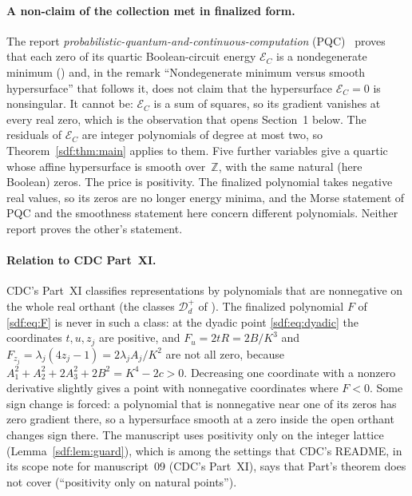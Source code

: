 \documentclass[11pt,a4paper]{article}
\theoremstyle{definition}
\theoremstyle{remark}
\newcommand{\Z}{\mathbb Z}
\newcommand{\Dplus}{\mathcal D^{+}}
\begin{document}
\paragraph{A non-claim of the collection met in finalized form.} The report
\emph{probabilistic-quantum-and-continuous-computation} (PQC)~\cite{pqcreport}
proves that each zero of its quartic Boolean-circuit energy $\mathcal E_C$
is a nondegenerate minimum () and, in the remark
``Nondegenerate minimum versus smooth hypersurface'' that follows it, does
not claim that the hypersurface $\mathcal E_C=0$ is nonsingular. It cannot
be: $\mathcal E_C$ is a sum of squares, so its gradient vanishes at every
real zero, which is the observation that opens Section~1 below. The residuals
of $\mathcal E_C$ are integer polynomials of degree at most two, so
Theorem~\ref{sdf:thm:main} applies to them. Five further variables give a
quartic whose affine hypersurface is smooth over~$\Z$, with the same natural
(here Boolean) zeros. The price is positivity. The finalized polynomial
takes negative real values, so its zeros are no longer energy minima, and the
Morse statement of PQC and the smoothness statement here concern different
polynomials. Neither report proves the other's statement.

\paragraph{Relation to CDC Part~XI.} CDC's Part~XI classifies
representations by polynomials that are nonnegative on the whole real orthant
(the classes $\Dplus_d$ of ). The finalized
polynomial $F$ of \eqref{sdf:eq:F} is never in such a class: at the dyadic
point \eqref{sdf:eq:dyadic} the coordinates $t,u,z_j$ are positive, and
$F_u=2tR=2B/K^3$ and $F_{z_j}=\lambda_j(4z_j-1)=2\lambda_jA_j/K^2$ are not
all zero, because $A_1^2+A_2^2+2A_3^2+2B^2=K^4-2c>0$. Decreasing one
coordinate with a nonzero derivative slightly gives a point with nonnegative
coordinates where $F<0$. Some sign change is forced: a polynomial that is
nonnegative near one of its zeros has zero gradient there, so a hypersurface
smooth at a zero inside the open orthant changes sign there. The manuscript
uses positivity only on the integer lattice (Lemma~\ref{sdf:lem:guard}),
which is among the settings that CDC's README, in its scope note for
manuscript~09 (CDC's Part~XI), says that Part's theorem does not cover
(``positivity only on natural points'').
\end{document}
